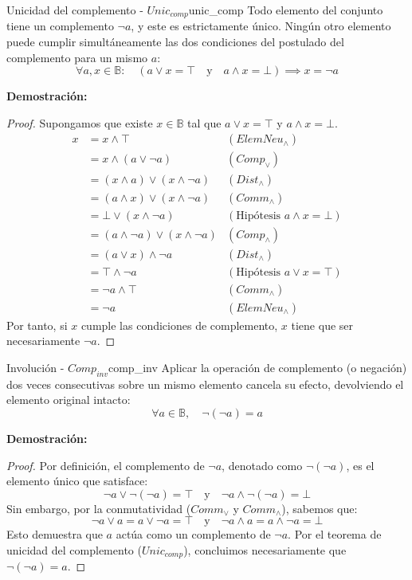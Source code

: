 \documentclass[12pt,a4paper]{article}
\newcommand{\desplegable}[2]{%
  \par\vspace{1ex}\noindent
  \textbf{Demostración:}
  \vspace{1ex}
  
  #2
  \par\vspace{1ex}
}
\begin{document}
\begin{teorema}{Unicidad del complemento - $Unic_{comp}$}{unic_comp}
Todo elemento del conjunto tiene un complemento $\neg a$, y este es estrictamente único. Ningún otro elemento puede cumplir simultáneamente las dos condiciones del postulado del complemento para un mismo $a$:
\[ \forall a, x \in \mathbb{B} : \quad (a \vee x = \top \quad \text{y} \quad a \wedge x = \bot) \implies x = \neg a \]
\end{teorema}
\desplegable{proof_unic_comp}{
\begin{proof}
Supongamos que existe $x \in \mathbb{B}$ tal que $a \vee x = \top$ y $a \wedge x = \bot$.
\begin{align*}
    x &= x \wedge \top & (ElemNeu_\wedge) \\
      &= x \wedge (a \vee \neg a) & (Comp_\vee) \\
      &= (x \wedge a) \vee (x \wedge \neg a) & (Dist_\wedge) \\
      &= (a \wedge x) \vee (x \wedge \neg a) & (Comm_\wedge) \\
      &= \bot \vee (x \wedge \neg a) & (\text{Hipótesis } a \wedge x = \bot) \\
      &= (a \wedge \neg a) \vee (x \wedge \neg a) & (Comp_\wedge) \\
      &= (a \vee x) \wedge \neg a & (Dist_\wedge) \\
      &= \top \wedge \neg a & (\text{Hipótesis } a \vee x = \top) \\
      &= \neg a \wedge \top & (Comm_\wedge) \\
      &= \neg a & (ElemNeu_\wedge)
\end{align*}
Por tanto, si $x$ cumple las condiciones de complemento, $x$ tiene que ser necesariamente $\neg a$.
\end{proof}
}

\begin{teorema}{Involución - $Comp_{inv}$}{comp_inv}
Aplicar la operación de complemento (o negación) dos veces consecutivas sobre un mismo elemento cancela su efecto, devolviendo el elemento original intacto:
\[ \forall a \in \mathbb{B}, \quad \neg (\neg a) = a \]
\end{teorema}
\desplegable{proof_comp_inv}{
\begin{proof}
Por definición, el complemento de $\neg a$, denotado como $\neg (\neg a)$, es el elemento único que satisface:
$$ \neg a \vee \neg (\neg a) = \top \quad \text{y} \quad \neg a \wedge \neg (\neg a) = \bot $$
Sin embargo, por la conmutatividad ($Comm_\vee$ y $Comm_\wedge$), sabemos que:
$$ \neg a \vee a = a \vee \neg a = \top \quad \text{y} \quad \neg a \wedge a = a \wedge \neg a = \bot $$
Esto demuestra que $a$ actúa como un complemento de $\neg a$. Por el teorema de unicidad del complemento ($Unic_{comp}$), concluimos necesariamente que $\neg (\neg a) = a$.
\end{proof}
}
\end{document}
